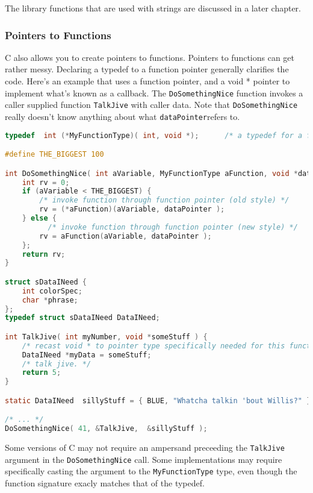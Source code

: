 The library functions that are used with strings are discussed in a later chapter.

\subsubsection{Pointers to Functions}
C also allows you to create pointers to functions. Pointers to functions can
get rather messy. Declaring a typedef to a function pointer generally clarifies
the code. Here's an example that uses a function pointer, and a void * pointer
to implement what's known as a callback. The \texttt{DoSomethingNice} function
invokes a caller supplied function \texttt{TalkJive} with caller data. Note
that \texttt{DoSomethingNice} really doesn't know anything about what
\texttt{dataPointer}refers to.
\lstset{basicstyle=\scriptsize, numbers=left, captionpos=b, tabsize=4}
\begin{lstlisting}[caption=Section \thesection listing \arabic{pntcnt},language={C},
breaklines=true,xleftmargin=15pt,label=lst:section\thesection listing\arabic{pntcnt}]
typedef  int (*MyFunctionType)( int, void *);      /* a typedef for a function pointer */

#define THE_BIGGEST 100

int DoSomethingNice( int aVariable, MyFunctionType aFunction, void *dataPointer ) {
	int rv = 0;
	if (aVariable < THE_BIGGEST) {
		/* invoke function through function pointer (old style) */
		rv = (*aFunction)(aVariable, dataPointer );
	} else {
		  /* invoke function through function pointer (new style) */
		rv = aFunction(aVariable, dataPointer );
	};
	return rv;
}

struct sDataINeed {
	int colorSpec;
	char *phrase;
};
typedef struct sDataINeed DataINeed;

int TalkJive( int myNumber, void *someStuff ) {
	/* recast void * to pointer type specifically needed for this function */
	DataINeed *myData = someStuff;
	/* talk jive. */
	return 5;
}

static DataINeed  sillyStuff = { BLUE, "Whatcha talkin 'bout Willis?" };

/* ... */
DoSomethingNice( 41, &TalkJive,  &sillyStuff );
\end{lstlisting}

Some versions of C may not require an ampersand preceeding the
\texttt{TalkJive} argument in the \texttt{DoSomethingNice} call. Some
implementations may require specifically casting the argument to the
\texttt{MyFunctionType} type, even though the function signature exacly matches
that of the typedef.

